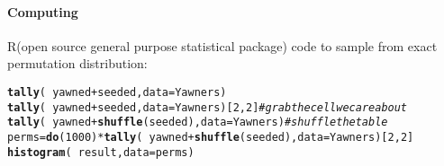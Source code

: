 \documentclass[10pt]{article}\usepackage[]{graphicx}\usepackage[]{color}
\makeatletter
\newcommand{\hlnum}[1]{\textcolor[rgb]{0.686,0.059,0.569}{#1}}%
\newcommand{\hlcom}[1]{\textcolor[rgb]{0.678,0.584,0.686}{\textit{#1}}}%
\newcommand{\hlopt}[1]{\textcolor[rgb]{0,0,0}{#1}}%
\newcommand{\hlstd}[1]{\textcolor[rgb]{0.345,0.345,0.345}{#1}}%
\newcommand{\hlkwb}[1]{\textcolor[rgb]{0.69,0.353,0.396}{#1}}%
\newcommand{\hlkwc}[1]{\textcolor[rgb]{0.333,0.667,0.333}{#1}}%
\newcommand{\hlkwd}[1]{\textcolor[rgb]{0.737,0.353,0.396}{\textbf{#1}}}%
\newenvironment{kframe}{%
 \def\at@end@of@kframe{}%
 \ifinner\ifhmode%
  \def\at@end@of@kframe{\end{minipage}}%
  \begin{minipage}{\columnwidth}%
 \fi\fi%
 \def\FrameCommand##1{\hskip\@totalleftmargin \hskip-\fboxsep
 \colorbox{shadecolor}{##1}\hskip-\fboxsep
     \hskip-\linewidth \hskip-\@totalleftmargin \hskip\columnwidth}%
 \MakeFramed {\advance\hsize-\width
   \@totalleftmargin\z@ \linewidth\hsize
   \@setminipage}}%
 {\par\unskip\endMakeFramed%
 \at@end@of@kframe}
\newenvironment{knitrout}{}{} %
\newcommand{\R}{{\sf R}\xspace}
\makeatother
\begin{document}
\paragraph{Computing}
\R (open source general purpose statistical package) code to sample from exact permutation distribution:


\begin{knitrout}
\color{fgcolor}\begin{kframe}
\begin{alltt}
\hlkwd{tally}\hlstd{(}\hlopt{~}\hlstd{yawned} \hlopt{+} \hlstd{seeded,} \hlkwc{data} \hlstd{= Yawners)}
\hlkwd{tally}\hlstd{(}\hlopt{~}\hlstd{yawned} \hlopt{+} \hlstd{seeded,} \hlkwc{data} \hlstd{= Yawners)[}\hlnum{2}\hlstd{,}\hlnum{2}\hlstd{]}    \hlcom{# grab the cell we care about}
\hlkwd{tally}\hlstd{(}\hlopt{~}\hlstd{yawned} \hlopt{+} \hlkwd{shuffle}\hlstd{(seeded),} \hlkwc{data} \hlstd{= Yawners)}  \hlcom{# shuffle the table}
\hlstd{perms} \hlkwb{=} \hlkwd{do}\hlstd{(}\hlnum{1000}\hlstd{)} \hlopt{*} \hlkwd{tally}\hlstd{(}\hlopt{~} \hlstd{yawned} \hlopt{+} \hlkwd{shuffle}\hlstd{(seeded),} \hlkwc{data} \hlstd{= Yawners)[}\hlnum{2}\hlstd{,}\hlnum{2}\hlstd{]}
\hlkwd{histogram}\hlstd{(}\hlopt{~}\hlstd{result,} \hlkwc{data} \hlstd{= perms)}
\end{alltt}
\end{kframe}
\end{knitrout}
\end{document}
